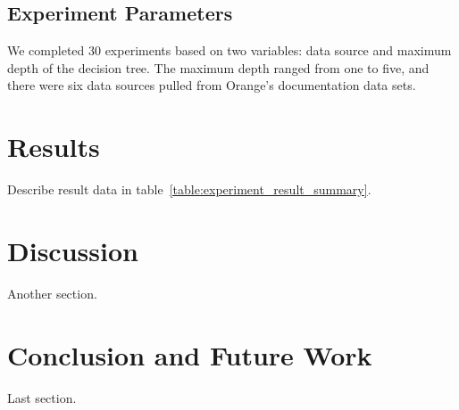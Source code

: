 \documentclass{sig-alternate}
\begin{document}
\subsection{Experiment Parameters}
We completed 30 experiments based on two variables: data source and maximum depth of the decision tree. The maximum depth ranged from one to five, and there were six data sources pulled from Orange's documentation data sets.

\section{Results}
Describe result data in table~\ref{table:experiment_result_summary}.

\section{Discussion}
Another section.

\section{Conclusion and Future Work}
Last section.

%

%
\end{document}
